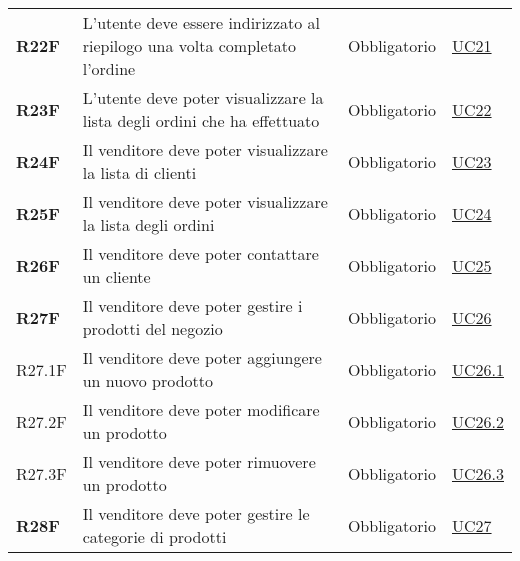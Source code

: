 \begin{center}
\begin{longtable}[!h]{p{50px} p{245px} p{75px} p{50px}}
        \textbf{R22F}                         & L'utente deve essere indirizzato al riepilogo una volta completato l'ordine                                & Obbligatorio             & \hyperref[sec:UC21]{UC21}                    \\
        \textbf{R23F}                         & L'utente deve poter visualizzare la lista degli ordini che ha effettuato                                   & Obbligatorio             & \hyperref[sec:UC22]{UC22}                    \\
        \textbf{R24F}                         & Il venditore deve poter visualizzare la lista di clienti                                                   & Obbligatorio             & \hyperref[sec:UC23]{UC23}                    \\
        \textbf{R25F}                         & Il venditore deve poter visualizzare la lista degli ordini                                                 & Obbligatorio             & \hyperref[sec:UC24]{UC24}                    \\
        \textbf{R26F}                         & Il venditore deve poter contattare un cliente                                                              & Obbligatorio             & \hyperref[sec:UC25]{UC25}                    \\
        \textbf{R27F}                         & Il venditore deve poter gestire i prodotti del negozio                                                     & Obbligatorio             & \hyperref[sec:UC26]{UC26}                    \\
        R27.1F                                & Il venditore deve poter aggiungere un nuovo prodotto                                                       & Obbligatorio             & \hyperref[sec:UC26.1]{UC26.1}                \\
        R27.2F                                & Il venditore deve poter modificare un prodotto                                                             & Obbligatorio             & \hyperref[sec:UC26.2]{UC26.2}                \\
        R27.3F                                & Il venditore deve poter rimuovere un prodotto                                                              & Obbligatorio             & \hyperref[sec:UC26.3]{UC26.3}                \\
        \textbf{R28F}                         & Il venditore deve poter gestire le categorie di prodotti                                                   & Obbligatorio             & \hyperref[sec:UC27]{UC27}                    \\

\end{longtable}
\end{center}
